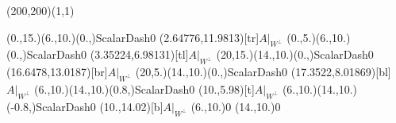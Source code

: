 \unitlength=1bp%

\begin{feynartspicture}(200,200)(1,1)

\FADiagram{}
\FAProp(0.,15.)(6.,10.)(0.,){ScalarDash}{0}
\FALabel(2.64776,11.9813)[tr]{$A|_{W^\perp}$}
\FAProp(0.,5.)(6.,10.)(0.,){ScalarDash}{0}
\FALabel(3.35224,6.98131)[tl]{$A|_{W^\perp}$}
\FAProp(20,15.)(14.,10.)(0.,){ScalarDash}{0}
\FALabel(16.6478,13.0187)[br]{$A|_{W^\perp}$}
\FAProp(20,5.)(14.,10.)(0.,){ScalarDash}{0}
\FALabel(17.3522,8.01869)[bl]{$A|_{W^\perp}$}
\FAProp(6.,10.)(14.,10.)(0.8,){ScalarDash}{0}
\FALabel(10.,5.98)[t]{$A|_{W^\perp}$}
\FAProp(6.,10.)(14.,10.)(-0.8,){ScalarDash}{0}
\FALabel(10.,14.02)[b]{$A|_{W^\perp}$}
\FAVert(6.,10.){0}
\FAVert(14.,10.){0}
\end{feynartspicture}

